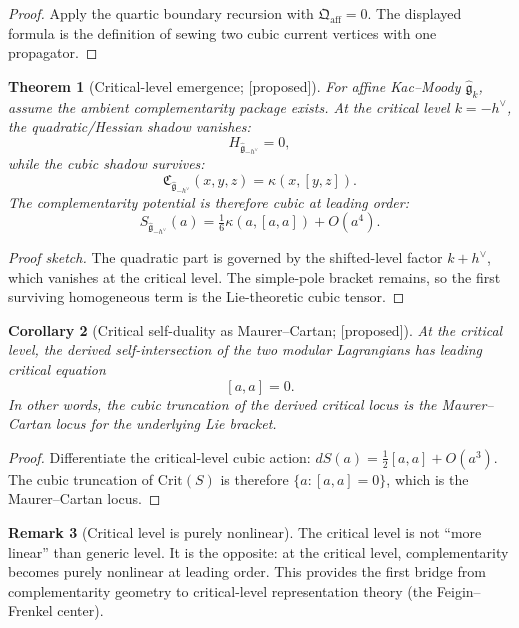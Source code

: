 \documentclass[11pt,oneside]{memoir}
\numberwithin{equation}{chapter}
\newtheorem{theorem}{Theorem}[chapter]
\newtheorem{corollary}[theorem]{Corollary}
\theoremstyle{definition}
\newtheorem{remark}[theorem]{Remark}
\newcommand{\ClaimStatusConjectured}{\textnormal{[proposed]}}
\begin{document}
\begin{proof}
Apply the quartic boundary recursion with $\mathfrak Q_{\mathrm{aff}}=0$.  The displayed formula is the definition of sewing two cubic current vertices with one propagator.\qedhere
\end{proof}

\begin{theorem}[Critical-level emergence; \ClaimStatusConjectured]
\label{thm:nms-critical-level-emergence}
For affine Kac--Moody $\widehat{\mathfrak{g}}_k$, assume the ambient complementarity package exists.  At the critical level $k = -h^\vee$, the quadratic/Hessian shadow vanishes:
\[
H_{\widehat{\mathfrak{g}}_{-h^\vee}} = 0,
\]
while the cubic shadow survives:
\[
\mathfrak C_{\widehat{\mathfrak{g}}_{-h^\vee}}(x,y,z) = \kappa(x,[y,z]).
\]
The complementarity potential is therefore cubic at leading order:
\[
S_{\widehat{\mathfrak{g}}_{-h^\vee}}(a) = \tfrac16\kappa(a,[a,a]) + O(a^4).
\]
\end{theorem}

\begin{proof}[Proof sketch]
The quadratic part is governed by the shifted-level factor $k + h^\vee$, which vanishes at the critical level.  The simple-pole bracket remains, so the first surviving homogeneous term is the Lie-theoretic cubic tensor.\qedhere
\end{proof}

\begin{corollary}[Critical self-duality as Maurer--Cartan; \ClaimStatusConjectured]
\label{cor:nms-critical-mc}
At the critical level, the derived self-intersection of the two modular Lagrangians has leading critical equation
\[
[a,a] = 0.
\]
In other words, the cubic truncation of the derived critical locus is the Maurer--Cartan locus for the underlying Lie bracket.
\end{corollary}

\begin{proof}
Differentiate the critical-level cubic action: $dS(a) = \frac12[a,a] + O(a^3)$.  The cubic truncation of $\mathrm{Crit}(S)$ is therefore $\{a : [a,a] = 0\}$, which is the Maurer--Cartan locus.\qedhere
\end{proof}

\begin{remark}[Critical level is purely nonlinear]
\label{rem:nms-critical-purely-nonlinear}
The critical level is not ``more linear'' than generic level.  It is the opposite: at the critical level, complementarity becomes purely nonlinear at leading order.  This provides the first bridge from complementarity geometry to critical-level representation theory (the Feigin--Frenkel center).
\end{remark}
\end{document}
